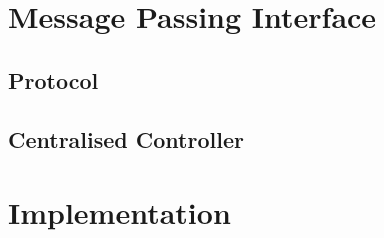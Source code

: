 \chapter{Message Passing Interface}

\section{Protocol}\label{sec:mpiprotocol}


\section{Centralised Controller}\label{sec:mpicontroller}


\chapter{Implementation}



